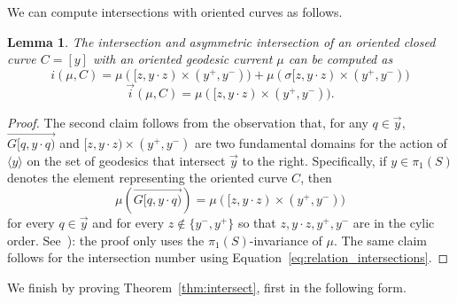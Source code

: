 \documentclass[11pt]{amsart}
\newcommand{\ora}[1]{\overrightarrow{#1}}
\numberwithin{equation}{section}
\numberwithin{figure}{section}
\newtheorem{lemma}[theorem]{Lemma}
\theoremstyle{definition}
\theoremstyle{plain}
\begin{document}
We can compute intersections with oriented curves as follows.

\begin{lemma}The intersection and asymmetric intersection
of an oriented closed curve $C=[y]$ with an oriented geodesic current $\mu$ can be computed as 
\[
i(\mu, C) = \mu([z,y \cdot z) \times (y^+,y^-)) + \mu(\sigma[z,y \cdot z) \times (y^+,y^-))
\]
\[
\vec{i}(\mu, C) = \mu([z,y \cdot z) \times (y^+,y^-)).
\]
\end{lemma}
\begin{proof}
The second claim follows from the observation that, for any $q \in \ora{y}$, $\ora{G[q, y\cdot q)}$ and $[z, y\cdot z) \times (y^+, y^-)$ are two fundamental domains for the action of $\langle y \rangle$ on the set of geodesics that intersect $\ora{y}$ to the right.
Specifically, if $y \in \pi_1(S)$ denotes the element representing the oriented curve $C$, then 
\[
\mu(\ora{G[q, y \cdot q)})= \mu([z,y \cdot z) \times (y^+,y^-))
\]
for every $q \in \ora{y}$ and for every $z \notin \{ y^-, y^+\}$ so that $z, y\cdot z, y^+, y^-$ are in the cylic order. See~\cite[Lemma~4.8]{HP97:RigidityNegCurvedCone}): the proof only uses
the $\pi_1(S)$-invariance of $\mu$. 
The same claim follows for the intersection number using Equation~\ref{eq:relation_intersections}.
\end{proof}



We finish by proving Theorem~\ref{thm:intersect}, first in the following
form.
\end{document}
